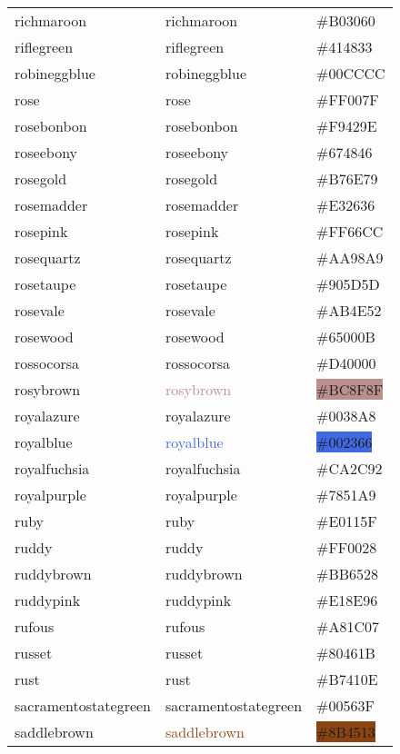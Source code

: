 \documentclass[
]{article}
\begin{document}
\begin{longtable}[]{@{}lll@{}}
richmaroon & \textcolor{richmaroon}{richmaroon} &
\colorbox{richmaroon}{\#B03060}\tabularnewline
riflegreen & \textcolor{riflegreen}{riflegreen} &
\colorbox{riflegreen}{\#414833}\tabularnewline
robineggblue & \textcolor{robineggblue}{robineggblue} &
\colorbox{robineggblue}{\#00CCCC}\tabularnewline
rose & \textcolor{rose}{rose} &
\colorbox{brightpink}{\#FF007F}\tabularnewline
rosebonbon & \textcolor{rosebonbon}{rosebonbon} &
\colorbox{rosebonbon}{\#F9429E}\tabularnewline
roseebony & \textcolor{roseebony}{roseebony} &
\colorbox{roseebony}{\#674846}\tabularnewline
rosegold & \textcolor{rosegold}{rosegold} &
\colorbox{rosegold}{\#B76E79}\tabularnewline
rosemadder & \textcolor{rosemadder}{rosemadder} &
\colorbox{alizarin}{\#E32636}\tabularnewline
rosepink & \textcolor{rosepink}{rosepink} &
\colorbox{rosepink}{\#FF66CC}\tabularnewline
rosequartz & \textcolor{rosequartz}{rosequartz} &
\colorbox{rosequartz}{\#AA98A9}\tabularnewline
rosetaupe & \textcolor{rosetaupe}{rosetaupe} &
\colorbox{rosetaupe}{\#905D5D}\tabularnewline
rosevale & \textcolor{rosevale}{rosevale} &
\colorbox{redwood}{\#AB4E52}\tabularnewline
rosewood & \textcolor{rosewood}{rosewood} &
\colorbox{rosewood}{\#65000B}\tabularnewline
rossocorsa & \textcolor{rossocorsa}{rossocorsa} &
\colorbox{rossocorsa}{\#D40000}\tabularnewline
rosybrown & \textcolor{rosybrown}{rosybrown} &
\colorbox{rosybrown}{\#BC8F8F}\tabularnewline
royalazure & \textcolor{royalazure}{royalazure} &
\colorbox{royalazure}{\#0038A8}\tabularnewline
royalblue & \textcolor{royalblue}{royalblue} &
\colorbox{royalblue}{\#002366}\tabularnewline
royalfuchsia & \textcolor{royalfuchsia}{royalfuchsia} &
\colorbox{royalfuchsia}{\#CA2C92}\tabularnewline
royalpurple & \textcolor{royalpurple}{royalpurple} &
\colorbox{royalpurple}{\#7851A9}\tabularnewline
ruby & \textcolor{ruby}{ruby} & \colorbox{ruby}{\#E0115F}\tabularnewline
ruddy & \textcolor{ruddy}{ruddy} &
\colorbox{ruddy}{\#FF0028}\tabularnewline
ruddybrown & \textcolor{ruddybrown}{ruddybrown} &
\colorbox{ruddybrown}{\#BB6528}\tabularnewline
ruddypink & \textcolor{ruddypink}{ruddypink} &
\colorbox{ruddypink}{\#E18E96}\tabularnewline
rufous & \textcolor{rufous}{rufous} &
\colorbox{rufous}{\#A81C07}\tabularnewline
russet & \textcolor{russet}{russet} &
\colorbox{russet}{\#80461B}\tabularnewline
rust & \textcolor{rust}{rust} & \colorbox{rust}{\#B7410E}\tabularnewline
sacramentostategreen &
\textcolor{sacramentostategreen}{sacramentostategreen} &
\colorbox{sacramentostategreen}{\#00563F}\tabularnewline
saddlebrown & \textcolor{saddlebrown}{saddlebrown} &
\colorbox{saddlebrown}{\#8B4513}\tabularnewline

\end{longtable}
\end{document}
